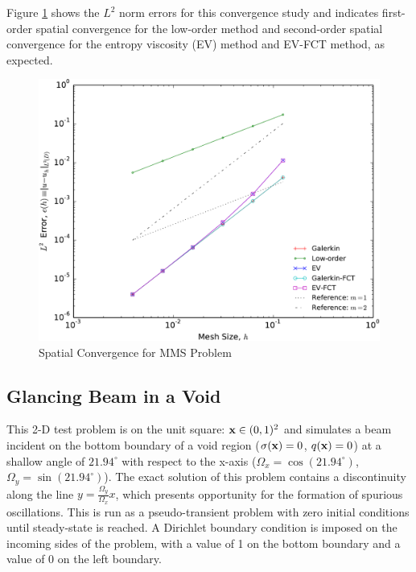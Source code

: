 Figure \ref{fig:mms_sinx_ss} shows the $L^2$ norm errors for this convergence study
and indicates first-order spatial convergence for the low-order method and
second-order spatial convergence for the entropy viscosity (EV) method
and EV-FCT method, as expected.
\begin{figure}[htb]
   \centering
      \includegraphics[width=\textwidth]
        {images/convergence_sinx.pdf}
      \caption{Spatial Convergence for MMS Problem}
   \label{fig:mms_sinx_ss}
\end{figure}
\clearpage
\subsection{Glancing Beam in a Void}
This 2-D test problem is on the unit square: $\mathbf{x}\in(0,1)^2$ and simulates
a beam incident on the bottom boundary of a void region
($\sigma(\mathbf{x})= 0$, $q(\mathbf{x})=0$) at a shallow angle of
$21.94^\circ$ with respect to the x-axis ($\Omega_x=\cos(21.94^\circ)$,
$\Omega_y=\sin(21.94^\circ)$).
The exact solution of this problem contains a discontinuity along the line
$y = \frac{\Omega_y}{\Omega_x}x$, which presents opportunity for the formation
of spurious oscillations.
This is run as a pseudo-transient problem with zero initial conditions until
steady-state is reached. A Dirichlet
boundary condition is imposed on the incoming sides of the problem, with a value of 1
on the bottom boundary and a value of 0 on the left boundary.

